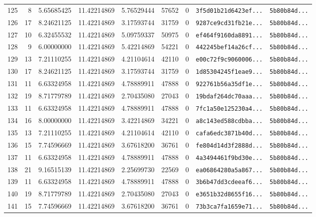 \documentclass[10pt]{article}
\begin{document}
\begin{longtable}{rrrrrrrll}
  125 & 8 & 5.65685425 & 11.42214869 & 5.76529444 & 57652 & 0 & \texttt{3f5d01b21d6423ef...} & \texttt{5b80b84d...} \\
  126 & 17 & 8.24621125 & 11.42214869 & 3.17593744 & 31759 & 0 & \texttt{9287ce9cd31fb21e...} & \texttt{5b80b84d...} \\
  127 & 10 & 6.32455532 & 11.42214869 & 5.09759337 & 50975 & 0 & \texttt{ef464f9160da8891...} & \texttt{5b80b84d...} \\
  128 & 9 & 6.00000000 & 11.42214869 & 5.42214869 & 54221 & 0 & \texttt{442245bef14a26cf...} & \texttt{5b80b84d...} \\
  129 & 13 & 7.21110255 & 11.42214869 & 4.21104614 & 42110 & 0 & \texttt{e00c72f9c9060006...} & \texttt{5b80b84d...} \\
  130 & 17 & 8.24621125 & 11.42214869 & 3.17593744 & 31759 & 0 & \texttt{1d85304245f1eae9...} & \texttt{5b80b84d...} \\
  131 & 11 & 6.63324958 & 11.42214869 & 4.78889911 & 47888 & 0 & \texttt{922761b56a35df1e...} & \texttt{5b80b84d...} \\
  132 & 19 & 8.71779789 & 11.42214869 & 2.70435080 & 27043 & 0 & \texttt{19bdaf264dc70aaa...} & \texttt{5b80b84d...} \\
  133 & 11 & 6.63324958 & 11.42214869 & 4.78889911 & 47888 & 0 & \texttt{7fc1a50e125230a4...} & \texttt{5b80b84d...} \\
  134 & 16 & 8.00000000 & 11.42214869 & 3.42214869 & 34221 & 0 & \texttt{a8c143ed588cdbba...} & \texttt{5b80b84d...} \\
  135 & 13 & 7.21110255 & 11.42214869 & 4.21104614 & 42110 & 0 & \texttt{cafa6edc3871b40d...} & \texttt{5b80b84d...} \\
  136 & 15 & 7.74596669 & 11.42214869 & 3.67618200 & 36761 & 0 & \texttt{fe804d14d3f2888d...} & \texttt{5b80b84d...} \\
  137 & 11 & 6.63324958 & 11.42214869 & 4.78889911 & 47888 & 0 & \texttt{4a3494461f9bd30e...} & \texttt{5b80b84d...} \\
  138 & 21 & 9.16515139 & 11.42214869 & 2.25699730 & 22569 & 0 & \texttt{ea06864280a5a867...} & \texttt{5b80b84d...} \\
  139 & 11 & 6.63324958 & 11.42214869 & 4.78889911 & 47888 & 0 & \texttt{3b6b47dd3cdeeaf6...} & \texttt{5b80b84d...} \\
  140 & 19 & 8.71779789 & 11.42214869 & 2.70435080 & 27043 & 0 & \texttt{e3651b32d8655f16...} & \texttt{5b80b84d...} \\
  141 & 15 & 7.74596669 & 11.42214869 & 3.67618200 & 36761 & 0 & \texttt{73b3ca7fa1659e71...} & \texttt{5b80b84d...} \\

\end{longtable}
\end{document}
